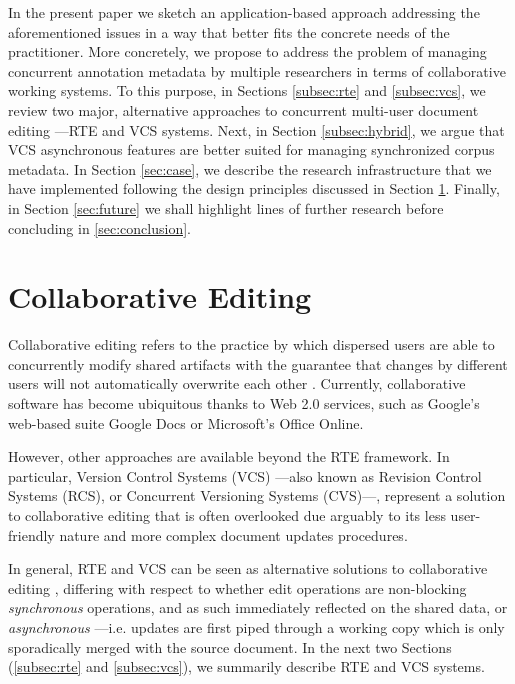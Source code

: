 \documentclass{sig-alternate}
\begin{document}
In the present paper we sketch an application-based approach addressing the aforementioned
issues in a way that better fits the concrete needs of the practitioner.
More concretely, we propose to address the problem of managing concurrent annotation
metadata by multiple researchers in terms of collaborative working systems.
To this purpose, in Sections \ref{subsec:rte} and \ref{subsec:vcs}, we review two major,
alternative approaches to concurrent multi-user document editing ---RTE and VCS systems.
Next, in Section \ref{subsec:hybrid}, we argue that VCS asynchronous features are better suited
for managing synchronized corpus metadata.
In Section \ref{sec:case}, we describe the research infrastructure that we have implemented
following the design principles discussed in Section \ref{sec:cde}.
Finally, in Section \ref{sec:future} we shall highlight lines of further research before
concluding in \ref{sec:conclusion}.

\section{Collaborative Editing}\label{sec:cde}
Collaborative editing refers to the practice by which dispersed
users are able to concurrently modify shared artifacts with the guarantee that changes
by different users will not automatically overwrite each other \cite{Altmanninger2009}.
Currently, collaborative software has become ubiquitous thanks to Web 2.0 services, such as
Google's web-based suite Google Docs or Microsoft's Office Online.

However, other approaches are available beyond the RTE framework. In
particular, Version Control Systems (VCS) ---also known as Revision Control
Systems (RCS), or Concurrent Versioning Systems (CVS)---, represent a solution
to collaborative editing that is often overlooked due arguably to its less user-friendly
nature and more complex document updates procedures.

In general, RTE and VCS can be seen as alternative solutions to collaborative
editing \cite{Altmanninger2009}, differing with respect to whether edit
operations are non-blocking \textit{synchronous} operations, and as such immediately reflected on the
shared data, or \textit{asynchronous} ---i.e. updates are first piped
through a working copy which is only sporadically merged with the source document.
In the next two Sections (\ref{subsec:rte} and \ref{subsec:vcs}), we summarily describe RTE
and VCS systems.
\end{document}
